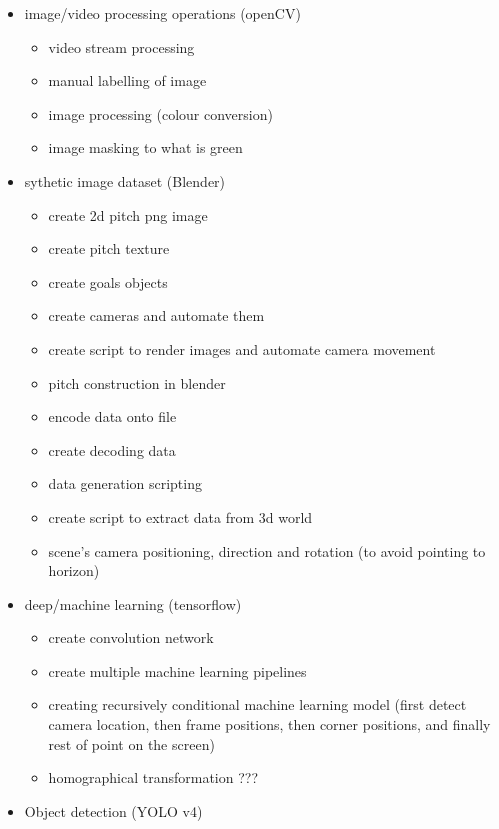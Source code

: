 \documentclass[
11pt,
twoside
]{report}
\begin{document}
\begin{itemize}
\item
  image/video processing operations (openCV)

  \begin{itemize}
  \item
    video stream processing
  \item
    manual labelling of image
  \item
    image processing (colour conversion)
  \item
    image masking to what is green
  \end{itemize}
\item
  sythetic image dataset (Blender)

  \begin{itemize}
  \item
    create 2d pitch png image
  \item
    create pitch texture
  \item
    create goals objects
  \item
    create cameras and automate them
  \item
    create script to render images and automate camera movement
  \item
    pitch construction in blender
  \item
    encode data onto file
  \item
    create decoding data
  \item
    data generation scripting
  \item
    create script to extract data from 3d world
  \item
    scene's camera positioning, direction and rotation (to avoid
    pointing to horizon)
  \end{itemize}
\item
  deep/machine learning (tensorflow)

  \begin{itemize}
  \item
    create convolution network
  \item
    create multiple machine learning pipelines
  \item
    creating recursively conditional machine learning model (first
    detect camera location, then frame positions, then corner positions,
    and finally rest of point on the screen)
  \item
    homographical transformation ???
  \end{itemize}
\item
  Object detection (YOLO v4)


\end{itemize}
\end{document}
